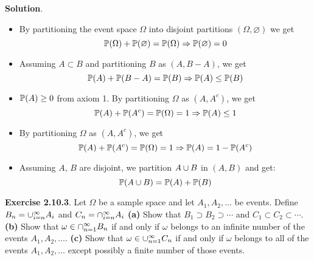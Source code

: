 \textbf{Solution}.
\begin{itemize}
\item
  By partitioning the event space \(\Omega\) into disjoint partitions
  \((\Omega, \varnothing)\) we get
  \[
\operatorname{\mathbb{P}}(\Omega) + \operatorname{\mathbb{P}}(\varnothing) = \operatorname{\mathbb{P}}(\Omega) \Rightarrow \operatorname{\mathbb{P}}(\varnothing) = 0
\]
\item
  Assuming \(A \subset B\) and partitioning \(B\) as \((A, B - A)\), we
  get
  \[
\operatorname{\mathbb{P}}(A) + \operatorname{\mathbb{P}}(B - A) = \operatorname{\mathbb{P}}(B) \Rightarrow \operatorname{\mathbb{P}}(A) \leq \operatorname{\mathbb{P}}(B)
\]
\item
  \(\operatorname{\mathbb{P}}(A) \geq 0\) from axiom 1. By partitioning \(\Omega\) as
  \((A, A^{c})\), we get
  \[
\operatorname{\mathbb{P}}(A) + \operatorname{\mathbb{P}}(A^{c}) = \operatorname{\mathbb{P}}(\Omega) = 1 \Rightarrow \operatorname{\mathbb{P}}(A) \leq 1
\]
\item
  By partitioning \(\Omega\) as \((A, A^{c})\), we get
  \[
\operatorname{\mathbb{P}}(A) + \operatorname{\mathbb{P}}(A^{c}) = \operatorname{\mathbb{P}}(\Omega) = 1 \Rightarrow \operatorname{\mathbb{P}}(A) = 1 - \operatorname{\mathbb{P}}(A^{c})
\]
\item
  Assuming \(A\), \(B\) are disjoint, we partition \(A \cup B\) in
  \((A, B)\) and get:
  \[
\operatorname{\mathbb{P}}(A \cup B) = \operatorname{\mathbb{P}}(A) + \operatorname{\mathbb{P}}(B)
\]
\end{itemize}

\textbf{Exercise 2.10.3}. Let \(\Omega\) be a sample space and let
\(A_{1}, A_{2}, \dots\) be events. Define \(B_{n} = \cup_{i=n}^{\infty} A_{i}\)
and \(C_{n} = \cap_{i=n}^{\infty} A_{i}\)
\textbf{(a)} Show that \(B_{1} \supset B_{2} \supset \cdots\) and
\(C_{1} \subset C_{2} \subset \cdots\).
\textbf{(b)} Show that \(\omega \in \cap_{n = 1}^{\infty} B_{n}\) if and
only if \(\omega\) belongs to an infinite number of the events
\(A_{1}, A_{2}, \dots\).
\textbf{(c)} Show that \(\omega \in \cup_{n = 1}^{\infty} C_{n}\) if and
only if \(\omega\) belongs to all of the events \(A_{1}, A_{2}, \dots\)
except possibly a finite number of those events.

